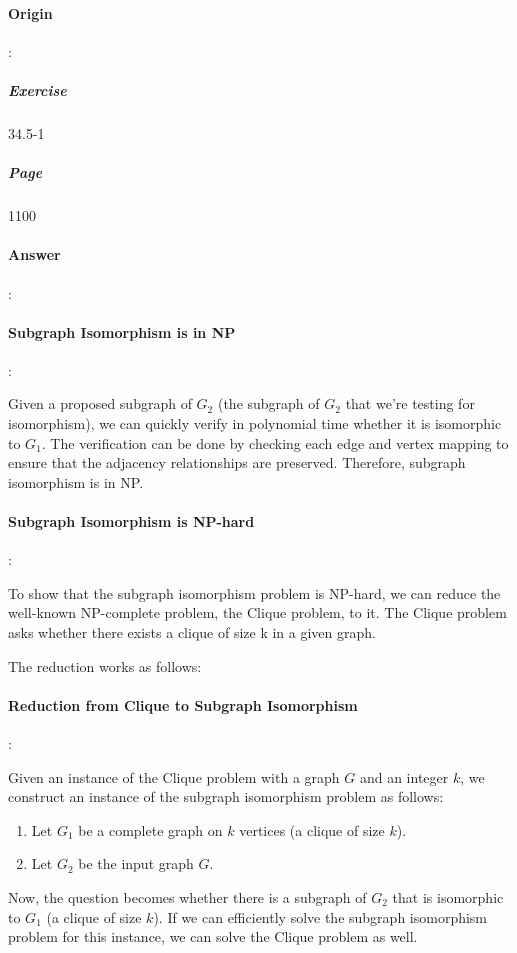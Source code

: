 \documentclass{article}
\begin{document}
\paragraph{Origin}:
  \subparagraph{Exercise}34.5-1
  \subparagraph{Page}1100
\paragraph{Answer}:



\paragraph{Subgraph Isomorphism is in NP}:

Given a proposed subgraph of $G_2$ (the subgraph of $G_2$ that we're testing for isomorphism), we can quickly verify in polynomial time whether it is isomorphic to $G_1$. The verification can be done by checking each edge and vertex mapping to ensure that the adjacency relationships are preserved. Therefore, subgraph isomorphism is in NP.

\paragraph{Subgraph Isomorphism is NP-hard}:

To show that the subgraph isomorphism problem is NP-hard, we can reduce the well-known NP-complete problem, the Clique problem, to it. The Clique problem asks whether there exists a clique of size k in a given graph.

The reduction works as follows:

\paragraph{Reduction from Clique to Subgraph Isomorphism}:

Given an instance of the Clique problem with a graph $G$ and an integer $k$, we construct an instance of the subgraph isomorphism problem as follows:

\begin{enumerate}
  \item Let $G_1$ be a complete graph on $k$ vertices (a clique of size $k$).
  \item Let $G_2$ be the input graph $G$.
\end{enumerate}

Now, the question becomes whether there is a subgraph of $G_2$ that is isomorphic to $G_1$ (a clique of size $k$). If we can efficiently solve the subgraph isomorphism problem for this instance, we can solve the Clique problem as well.
\end{document}
